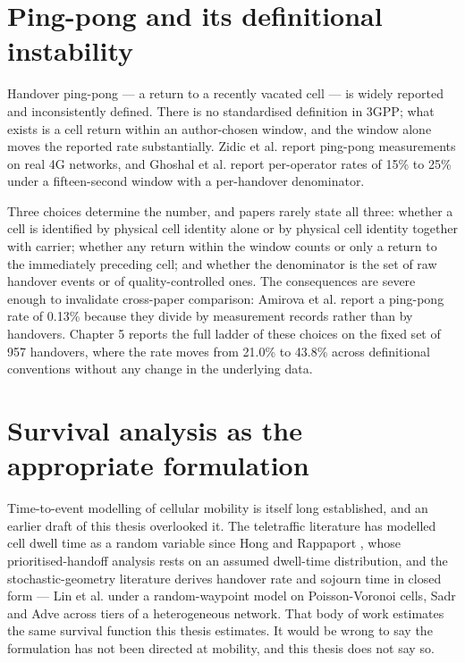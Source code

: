 \section{Ping-pong and its definitional instability}
\label{sec:2_4}

Handover ping-pong --- a return to a recently vacated cell --- is widely reported and inconsistently defined. There is no standardised definition in 3GPP; what exists is a cell return within an author-chosen window, and the window alone moves the reported rate substantially. Zidic et al. \cite{ref14} report ping-pong measurements on real 4G networks, and Ghoshal et al. \cite{ref4} report per-operator rates of 15\% to 25\% under a fifteen-second window with a per-handover denominator.

Three choices determine the number, and papers rarely state all three: whether a cell is identified by physical cell identity alone or by physical cell identity together with carrier; whether any return within the window counts or only a return to the immediately preceding cell; and whether the denominator is the set of raw handover events or of quality-controlled ones. The consequences are severe enough to invalidate cross-paper comparison: Amirova et al. \cite{ref15} report a ping-pong rate of 0.13\% because they divide by measurement records rather than by handovers. Chapter 5 reports the full ladder of these choices on the fixed set of 957 handovers, where the rate moves from 21.0\% to 43.8\% across definitional conventions without any change in the underlying data.


\section{Survival analysis as the appropriate formulation}
\label{sec:2_5}

Time-to-event modelling of cellular mobility is itself long established, and an earlier draft of this thesis overlooked it. The teletraffic literature has modelled cell dwell time as a random variable since Hong and Rappaport \cite{ref42}, whose prioritised-handoff analysis rests on an assumed dwell-time distribution, and the stochastic-geometry literature derives handover rate and sojourn time in closed form --- Lin et al. \cite{ref43} under a random-waypoint model on Poisson-Voronoi cells, Sadr and Adve \cite{ref44} across tiers of a heterogeneous network. That body of work estimates the same survival function this thesis estimates. It would be wrong to say the formulation has not been directed at mobility, and this thesis does not say so.

